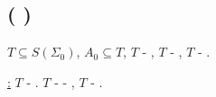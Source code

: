\subsection{\textcyr{\CYRT\cyre\cyro\cyrr\cyre\cyrm\cyra} (\textcyr{\CYRG\cyryo\cyrd\cyre\cyrl\cyrya}
\textcyr{\cyro} \textcyr{\cyrn\cyre\cyrp\cyro\cyrl\cyrn\cyro\cyrt\cyre})}

$T\subseteq S(\Sigma_{0})$, $A_{0}\subseteq T$, $T$ - \textcyr{\cyrp\cyre\cyrr\cyre\cyrch\cyri\cyrs\cyrl\cyri\cyrm\cyra},
$T$ - \textcyr{\cyrn\cyre\cyrp\cyrr\cyro\cyrt\cyri\cyrv\cyro\cyrr\cyre\cyrch\cyri\cyrv\cyra\cyrya}
\textcyr{\cyrt\cyre\cyro\cyrr\cyri\cyrya}, \textcyr{\cyrt\cyro\cyrg\cyrd\cyra}
$T$ - \textcyr{\cyrn\cyre} \textcyr{\cyrp\cyro\cyrl\cyrn\cyra}.

\uline{\textcyr{\CYRD\cyro\cyrk\cyra\cyrz\cyra\cyrt\cyre\cyrl\cyrsftsn\cyrs\cyrt\cyrv\cyro}:}
\textcyr{\CYRP\cyru\cyrs\cyrt\cyrsftsn} $T$ - \textcyr{\cyrp\cyro\cyrl\cyrn\cyra}.
\textcyr{\CYRS\cyrl\cyre\cyrd\cyro\cyrv\cyra\cyrt\cyre\cyrl\cyrsftsn\cyrn\cyro}
$T$ - \textcyr{\cyrr\cyra\cyrz\cyrr\cyre\cyrsh\cyri\cyrm\cyra} -
\textcyr{\cyrp\cyrr\cyro\cyrt\cyri\cyrv\cyro\cyrr\cyre\cyrch\cyri\cyre},
\textcyr{\cyrz\cyrn\cyra\cyrch\cyri\cyrt} $T$ - \textcyr{\cyrn\cyre}
\textcyr{\cyrp\cyro\cyrl\cyrn\cyra}.%


